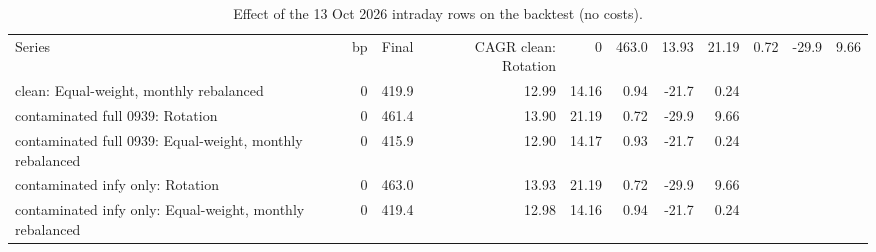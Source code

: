\begin{table}[ht]
\centering
\small
\caption{Effect of the 13 Oct 2026 intraday rows on the backtest (no costs).}
\label{tab:backtest-contaminated}
\begin{tabular}{lrrrrrrr}
\toprule
Series & bp & Final & CAGR %
\midrule
clean: Rotation & 0 & 463.0 & 13.93 & 21.19 & 0.72 & -29.9 & 9.66 \\
clean: Equal-weight, monthly rebalanced & 0 & 419.9 & 12.99 & 14.16 & 0.94 & -21.7 & 0.24 \\
contaminated full 0939: Rotation & 0 & 461.4 & 13.90 & 21.19 & 0.72 & -29.9 & 9.66 \\
contaminated full 0939: Equal-weight, monthly rebalanced & 0 & 415.9 & 12.90 & 14.17 & 0.93 & -21.7 & 0.24 \\
contaminated infy only: Rotation & 0 & 463.0 & 13.93 & 21.19 & 0.72 & -29.9 & 9.66 \\
contaminated infy only: Equal-weight, monthly rebalanced & 0 & 419.4 & 12.98 & 14.16 & 0.94 & -21.7 & 0.24 \\
\bottomrule
\end{tabular}
\end{table}

